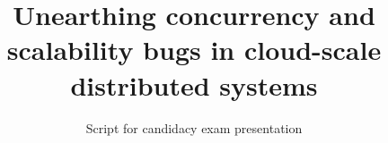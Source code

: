 

\title{Unearthing concurrency and scalability bugs in cloud-scale distributed systems}

\author{Script for candidacy exam presentation}

\maketitle


